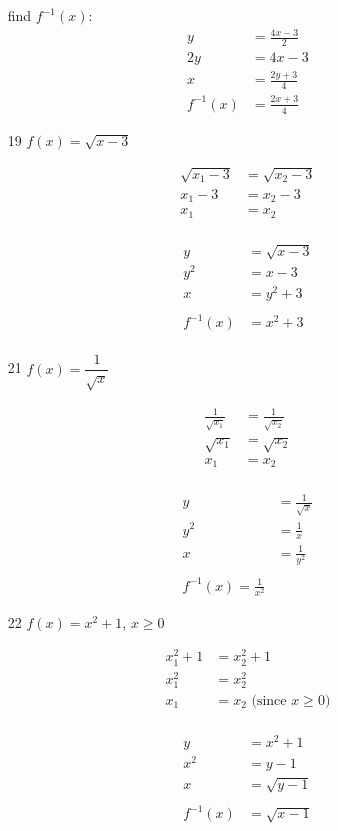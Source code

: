 \documentclass[fleqn,addpoints]{exam}
\begin{document}
\begin{itemize}
find $f^{-1}(x)$:
\begin{align*}
  y &= \frac{4x-3}{2} \\
  2y &= 4x-3 \\
  x &= \frac{2y+3}{4}
  \\
  f^{-1}(x) &= \frac{2x+3}{4}
\end{align*}

\item[19]
$f(x) = \sqrt{x-3}$

\begin{align*}
  \sqrt{x_1-3} &= \sqrt{x_2 - 3} \\
  x_1 - 3 &= x_2 - 3 \\
  x_1 &= x_2 \\
\end{align*}

\begin{align*}
  y &= \sqrt{x-3} \\
  y^2 &= x-3 \\
  x &= y^2 + 3 \\
  \\
  f^{-1}(x) &= x^2 + 3 \\
\end{align*}

\item[21]
$f(x) = \dfrac{1}{\sqrt{x}}$

\begin{align*}
  \frac{1}{\sqrt{x_1}} &= \frac{1}{\sqrt{x_2}} \\
  \sqrt{x_1} &= \sqrt{x_2} \\
  x_1 &= x_2 \\
\end{align*}

\begin{align*}
  y &= \frac{1}{\sqrt{x}} \\
  y^2 &= \frac{1}{x} \\
  x &= \frac{1}{y^2} \\
  \\
  f^{-1}(x) = \frac{1}{x^2}
\end{align*}

\item[22]
$f(x) = x^2 + 1$, $x \geq 0$

\begin{align*}
  x_1^2 + 1 &= x_2^2 + 1 \\
  x_1^2 &= x_2^2 \\
  x_1 &= x_2 \text{ (since $x \geq 0$)} \\
\end{align*}

\begin{align*}
  y &= x^2 + 1 \\
  x^2 &= y - 1 \\
  x &= \sqrt{y - 1} \\
\\
  f^{-1}(x) &= \sqrt{x-1} \\
\end{align*}

\end{itemize}
\end{document}
